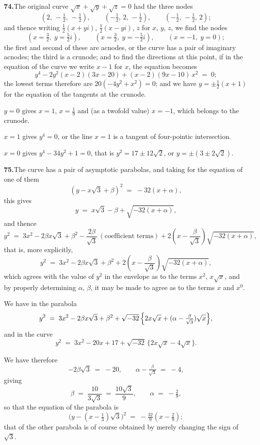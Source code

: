 \documentclass[11pt]{article}
\begin{document}
\medskip
\textbf{74.}\quad The original curve $\sqrt{x} + \sqrt{y} + \sqrt{z} = 0$ had the three nodes
\[
(2,\,-\tfrac{1}{2},\,-\tfrac{1}{2}),\qquad (-\tfrac{1}{2},\,2,\,-\tfrac{1}{2}),\qquad (-\tfrac{1}{2},\,-\tfrac{1}{2},\,2);
\]
and thence writing $\tfrac{1}{2}(x+yi)$, $\tfrac{1}{2}(x-yi)$, $z$ for $x$, $y$, $z$, we find the nodes
\[
(x = \tfrac{3}{2},\; y = \tfrac{5}{2} i),\qquad (x = \tfrac{3}{2},\; y = -\tfrac{5}{2} i),\qquad (x = -1,\; y = 0);
\]
the first and second of these are acnodes, or the curve has a pair of imaginary acnodes; the third is a crunode; and to find the directions at this point, if in the equation of the curve we write $x - 1$ for $x$, the equation becomes
\[
y^{4} - 2y^{2}(x-2)(3x-20) + (x-2)(9x-10)\,x^{2} \;=\; 0;
\]
the lowest terms therefore are $20(-4y^{2} + x^{2}) = 0$; and we have $y = \pm\tfrac{1}{2}(x+1)$ for the equation of the tangents at the crunode.

\medskip

$y = 0$ gives $x = 1$, $x = \tfrac{1}{9}$ and (as a twofold value) $x = -1$, which belongs to the crunode.

$x = 1$ gives $y^{4} = 0$, or the line $x = 1$ is a tangent of four-pointic intersection.

$x = 0$ gives $y^{4} - 34 y^{2} + 1 = 0$, that is $y^{2} = 17 \pm 12\sqrt{2}$, or $y = \pm(3 \pm 2\sqrt{2})$.

\medskip
\textbf{75.}\quad The curve has a pair of asymptotic parabolas, and taking for the equation of one of them
\[
(y - x\sqrt{3} + \beta)^{2} \;=\; -32(x + \alpha),
\]
this gives
\[
y \;=\; x\sqrt{3} - \beta + \sqrt{-32(x+\alpha)},
\]
and thence
\[
y^{2} \;=\; 3x^{2} - 2\beta x\sqrt{3} + \beta^{2} - \frac{2\beta}{\sqrt{3}}\,(\text{coefficient terms}) + 2\!\left(x - \frac{\beta}{\sqrt{3}}\right)\sqrt{-32(x+\alpha)},
\]
that is, more explicitly,
\[
y^{2} \;=\; 3x^{2} - 2\beta x\sqrt{3} + \beta^{2} + 2\!\left(x - \frac{\beta}{\sqrt{3}}\right)\sqrt{-32(x+\alpha)},
\]
which agrees with the value of $y^{2}$ in the envelope as to the terms $x^{2}$, $x\sqrt{x}$, and by properly determining $\alpha$, $\beta$, it may be made to agree as to the terms $x$ and $x^{0}$.

We have in the parabola
\[
y^{2} \;=\; 3x^{2} - 2\beta x\sqrt{3} + \beta^{2} + \sqrt{-32}\,\Bigl\{2x\sqrt{x} + (\alpha - \tfrac{\beta}{\sqrt{3}})\sqrt{x}\Bigr\},
\]
and in the curve
\[
y^{2} \;=\; 3x^{2} - 20x + 17 + \sqrt{-32}\,\bigl\{2x\sqrt{x} - 4\sqrt{x}\bigr\}.
\]

We have therefore
\[
-2\beta\sqrt{3} \;=\; -20,\qquad \alpha - \tfrac{\beta}{\sqrt{3}} \;=\; -4,
\]
giving
\[
\beta \;=\; \frac{10}{3\sqrt{3}} \;=\; \frac{10\sqrt{3}}{9},\qquad \alpha \;=\; -\tfrac{2}{9},
\]
so that the equation of the parabola is
\[
\bigl(y - (x - \tfrac{1}{3})\sqrt{3}\bigr)^{2} \;=\; -\tfrac{32}{9}(x - \tfrac{2}{9});
\]
that of the other parabola is of course obtained by merely changing the sign of $\sqrt{3}$.
\end{document}
